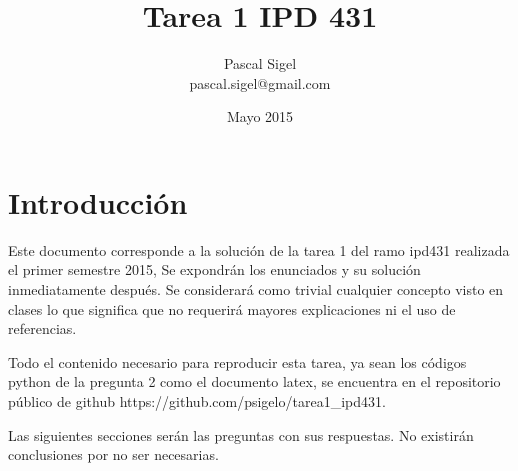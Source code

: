 \documentclass[11pt,twoside,letterpaper]{article}
\begin{document}
	\title{Tarea 1 IPD 431}
	\author{Pascal Sigel\\pascal.sigel@gmail.com}
	\date{Mayo 2015}
	\maketitle
	\newpage
	
	\section{Introducción}

	Este documento corresponde a la solución de la tarea 1 del ramo ipd431 realizada el primer semestre 2015, Se expondrán los enunciados y su solución inmediatamente después. Se considerará como trivial cualquier concepto visto en clases lo que significa que no requerirá mayores explicaciones ni el uso de referencias.\newline

	{Todo el contenido necesario para reproducir esta tarea, ya sean los códigos python de la pregunta 2 como el documento latex, se encuentra en el repositorio público de github https://github.com/psigelo/tarea1\_ipd431.}\newline


	Las siguientes secciones serán las preguntas con sus respuestas. No existirán conclusiones por no ser necesarias.\newline
	
	
	
	
\end{document}
